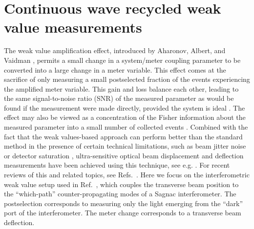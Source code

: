 \chapter[Continuous wave recycling]{Continuous wave recycled weak value measurements}\label{ch:cw}
The weak value amplification effect, introduced by Aharonov, Albert, and Vaidman \cite{Aharonov1988}, permits a small change in a system/meter coupling parameter to be converted into a large change in a meter variable.  This effect comes at the sacrifice of only measuring a small postselected fraction of the events experiencing the amplified meter variable.  This gain and loss balance each other, leading to the same signal-to-noise ratio (SNR) of the measured parameter as would be found if the measurement were made directly, provided the system is ideal \cite{Starling2010}.  The effect may also be viewed as a concentration of the Fisher information about the measured parameter into a small number of collected events \cite{Jordan2014,Viza2014,Pang2014}.  Combined with the fact that the weak values-based approach can perform better than the standard method in the presence of certain technical limitations, such as beam jitter noise or detector saturation \cite{Jordan2014,Viza2014}, ultra-sensitive optical beam displacement and deflection measurements have been achieved using this technique, see e.g. \cite{Hosten2008,Dixon2009,Hogan2011}.  For recent reviews of this and related topics, see Refs.~\cite{Kofman2012,Dressel2014}.  Here we focus on the interferometric weak value setup used in Ref.~\cite{Dixon2009}, which couples the transverse beam position to the ``which-path'' counter-propagating modes of a Sagnac interferometer.  The postselection corresponds to measuring only the light emerging from the ``dark'' port of the interferometer.  The meter change corresponds to a transverse beam deflection.

